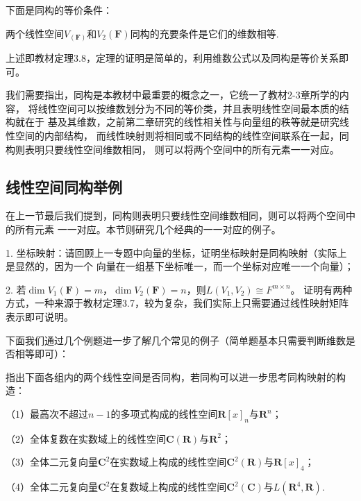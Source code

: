 下面是同构的等价条件：
\begin{theorem}
	两个线性空间$V_(\mathbf{F})$和$V_2(\mathbf{F})$同构的充要条件是它们的维数相等.
\end{theorem}
上述即教材定理3.8，定理的证明是简单的，利用维数公式以及同构是等价关系即可。

我们需要指出，同构是本教材中最重要的概念之一，它统一了教材2-3章所学的内容，
将线性空间可以按维数划分为不同的等价类，并且表明线性空间最本质的结构就在于
基及其维数，之前第二章研究的线性相关性与向量组的秩等就是研究线性空间的内部结构，
而线性映射则将相同或不同结构的线性空间联系在一起，同构则表明只要线性空间维数相同，
则可以将两个空间中的所有元素一一对应。
\subsection{线性空间同构举例}
在上一节最后我们提到，同构则表明只要线性空间维数相同，则可以将两个空间中的所有元素
一一对应。本节则研究几个经典的一一对应的例子。

1. 坐标映射：请回顾上一专题中向量的坐标，证明坐标映射是同构映射（实际上是显然的，因为一个
向量在一组基下坐标唯一，而一个坐标对应唯一一个向量）；

2. 若$\dim V_1(\mathbf{F})=m$，$\dim V_2(\mathbf{F})=n$，则$L(V_1,V_2) \cong F^{m \times n}$。
证明有两种方式，一种来源于教材定理3.7，较为复杂，我们实际上只需要通过线性映射矩阵表示即可说明。

下面我们通过几个例题进一步了解几个常见的例子（简单题基本只需要判断维数是否相等即可）：
\begin{example}
	指出下面各组内的两个线性空间是否同构，若同构可以进一步思考同构映射的构造：

	\textup{（1）}最高次不超过$n-1$的多项式构成的线性空间$\mathbf{R}[x]_n$与$\mathbf{R}^n$；

	\textup{（2）}全体复数在实数域上的线性空间$\mathbf{C}(\mathbf{R})$与$\mathbf{R}^2$；

	\textup{（3）}全体二元复向量$\mathbf{C}^2$在实数域上构成的线性空间$\mathbf{C}^2(\mathbf{R})$与$\mathbf{R}[x]_4$；

	\textup{（4）}全体二元复向量$\mathbf{C}^2$在复数域上构成的线性空间$\mathbf{C}^2(\mathbf{C})$与$L(\mathbf{R}^4,\mathbf{R})$.
\end{example}

